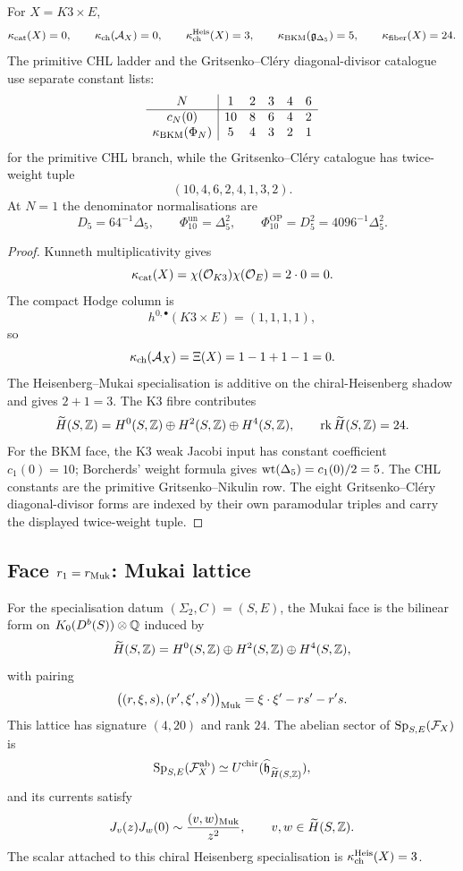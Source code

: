 \begin{proposition}
\label{wn:prop:k3e-four-constants}
For \(X=K3\times E\),
\[
  \kappa_{\mathrm{cat}}(X)=0,\qquad
  \kappa_{\mathrm{ch}}(\mathcal{A}_X)=0,\qquad
  \kappa_{\mathrm{ch}}^{\mathrm{Heis}}(X)=3,\qquad
  \kappa_{\mathrm{BKM}}(\mathfrak{g}_{\Delta_5})=5,\qquad
  \kappa_{\mathrm{fiber}}(X)=24.
\]
The primitive CHL ladder and the Gritsenko--Cl\'ery diagonal-divisor
catalogue use separate constant lists:
\[
\begin{array}{c|ccccc}
N&1&2&3&4&6\\ \hline
c_N(0)&10&8&6&4&2\\
\kappa_{\mathrm{BKM}}(\Phi_N)&5&4&3&2&1
\end{array}
\]
for the primitive CHL branch, while the Gritsenko--Cl\'ery catalogue has
twice-weight tuple
\[
  (10,4,6,2,4,1,3,2).
\]
At \(N=1\) the denominator normalisations are
\[
  D_5=64^{-1}\Delta_5,\qquad
  \Phi_{10}^{\mathrm{un}}=\Delta_5^2,\qquad
  \Phi_{10}^{\mathrm{OP}}=D_5^2=4096^{-1}\Delta_5^2.
\]
\end{proposition}

\begin{proof}
Kunneth multiplicativity gives
\[
  \kappa_{\mathrm{cat}}(X)=\chi(\mathcal{O}_{K3})\chi(\mathcal{O}_E)=2\cdot 0=0.
\]
The compact Hodge column is
\[
  h^{0,\bullet}(K3\times E)=(1,1,1,1),
\]
so
\[
  \kappa_{\mathrm{ch}}(\mathcal{A}_X)=\Xi(X)=1-1+1-1=0.
\]
The Heisenberg--Mukai specialisation is additive on the
chiral-Heisenberg shadow and gives \(2+1=3\).  The K3 fibre contributes
\[
  \widetilde H(S,\mathbb{Z})=H^0(S,\mathbb{Z})\oplus H^2(S,\mathbb{Z})\oplus H^4(S,\mathbb{Z}),
  \qquad \mathrm{rk}\,\widetilde H(S,\mathbb{Z})=24.
\]
For the BKM face, the K3 weak Jacobi input has constant coefficient
\(c_1(0)=10\); Borcherds' weight formula gives
\(\mathrm{wt}(\Delta_5)=c_1(0)/2=5\).  The CHL constants are the primitive
Gritsenko--Nikulin row.  The eight Gritsenko--Cl\'ery diagonal-divisor
forms are indexed by their own paramodular triples and carry the
displayed twice-weight tuple.
\end{proof}

\subsection{Face $r_1=r_{\mathrm{Muk}}$: Mukai lattice}
\label{wn:subsec:r1-Mukai}

\begin{proposition}[$r_{\Muk}$]
\label{wn:prop:r1-Mukai-witness}
For the specialisation datum \((\Sigma_2,C)=(S,E)\), the Mukai face is
the bilinear form on \(K_0(D^b(S))\otimes\mathbb{Q}\) induced by
\[
  \widetilde H(S,\mathbb{Z})=H^0(S,\mathbb{Z})\oplus H^2(S,\mathbb{Z})\oplus H^4(S,\mathbb{Z}),
\]
with pairing
\[
  \bigl((r,\xi,s),(r',\xi',s')\bigr)_{\mathrm{Muk}}
  =\xi\cdot \xi'-rs'-r's.
\]
This lattice has signature \((4,20)\) and rank \(24\).  The abelian
sector of \(\mathrm{Sp}_{S,E}(\mathcal{F}_X)\) is
\[
  \mathrm{Sp}_{S,E}(\mathcal{F}_X^{\mathrm{ab}})
  \simeq U^{\mathrm{chir}}(\widehat{\mathfrak{h}}_{\widetilde H(S,\mathbb{Z})}),
\]
and its currents satisfy
\[
  J_v(z)J_w(0)\sim \frac{(v,w)_{\mathrm{Muk}}}{z^2},
  \qquad v,w\in \widetilde H(S,\mathbb{Z}).
\]
The scalar attached to this chiral Heisenberg specialisation is
\(\kappa_{\mathrm{ch}}^{\mathrm{Heis}}(X)=3\).
\end{proposition}

